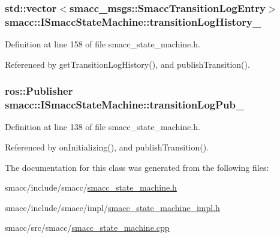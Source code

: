 \subsubsection[{\texorpdfstring{transition\+Log\+History\+\_\+}{transitionLogHistory_}}]{\setlength{\rightskip}{0pt plus 5cm}std\+::vector$<$smacc\+\_\+msgs\+::\+Smacc\+Transition\+Log\+Entry$>$ smacc\+::\+I\+Smacc\+State\+Machine\+::transition\+Log\+History\+\_\+\hspace{0.3cm}{\ttfamily [private]}}\hypertarget{classsmacc_1_1ISmaccStateMachine_af682d5fce5bb7c959e2b8814dae50023}{}\label{classsmacc_1_1ISmaccStateMachine_af682d5fce5bb7c959e2b8814dae50023}


Definition at line 158 of file smacc\+\_\+state\+\_\+machine.\+h.



Referenced by get\+Transition\+Log\+History(), and publish\+Transition().

\subsubsection[{\texorpdfstring{transition\+Log\+Pub\+\_\+}{transitionLogPub_}}]{\setlength{\rightskip}{0pt plus 5cm}ros\+::\+Publisher smacc\+::\+I\+Smacc\+State\+Machine\+::transition\+Log\+Pub\+\_\+\hspace{0.3cm}{\ttfamily [protected]}}\hypertarget{classsmacc_1_1ISmaccStateMachine_acc42eb050325c1edc77d81675fb1286a}{}\label{classsmacc_1_1ISmaccStateMachine_acc42eb050325c1edc77d81675fb1286a}


Definition at line 138 of file smacc\+\_\+state\+\_\+machine.\+h.



Referenced by on\+Initializing(), and publish\+Transition().



The documentation for this class was generated from the following files\+:\begin{DoxyCompactItemize}
\item 
smacc/include/smacc/\hyperlink{smacc__state__machine_8h}{smacc\+\_\+state\+\_\+machine.\+h}\item 
smacc/include/smacc/impl/\hyperlink{smacc__state__machine__impl_8h}{smacc\+\_\+state\+\_\+machine\+\_\+impl.\+h}\item 
smacc/src/smacc/\hyperlink{smacc__state__machine_8cpp}{smacc\+\_\+state\+\_\+machine.\+cpp}\end{DoxyCompactItemize}

